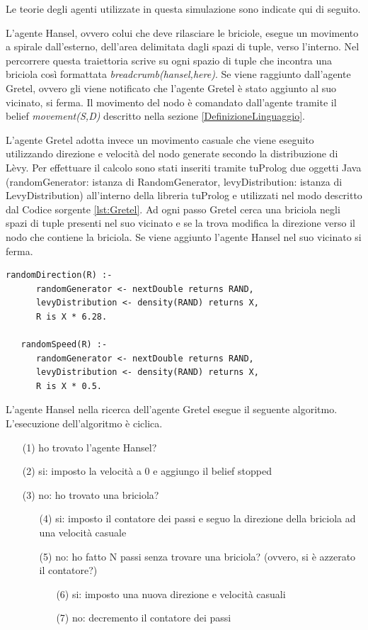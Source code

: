 \documentclass[12pt,a4paper,openright,twoside]{report}
\begin{document}
Le teorie degli agenti utilizzate in questa simulazione sono indicate qui di seguito.

L'agente Hansel, ovvero colui che deve rilasciare le briciole, esegue un movimento a spirale dall'esterno, dell'area delimitata dagli spazi di tuple, verso l'interno. Nel percorrere questa traiettoria scrive su ogni spazio di tuple che incontra una briciola cos\`i formattata \textit{breadcrumb(hansel,here)}.
Se viene raggiunto dall'agente Gretel, ovvero gli viene notificato che l'agente Gretel \`e stato aggiunto al suo vicinato, si ferma.
Il movimento del nodo \`e comandato dall'agente tramite il belief \textit{movement(S,D)} descritto nella sezione \ref{DefinizioneLinguaggio}.


L'agente Gretel adotta invece un movimento casuale che viene eseguito utilizzando direzione e velocit\`a del nodo generate secondo la distribuzione di L\`evy.
Per effettuare il calcolo sono stati inseriti tramite tuProlog due oggetti Java (randomGenerator: istanza di RandomGenerator, levyDistribution: istanza di LevyDistribution) all'interno della libreria tuProlog e utilizzati nel modo descritto dal Codice sorgente \ref{lst:Gretel}.
Ad ogni passo Gretel cerca una briciola negli spazi di tuple presenti nel suo vicinato e se la trova modifica la direzione verso il nodo che contiene la briciola.
Se viene aggiunto l'agente Hansel nel suo vicinato si ferma.
\medskip
\begin{lstlisting}[firstnumber=1,label={lst:Gretel},caption={Teoria agente Gretel}]
   randomDirection(R) :-
      randomGenerator <- nextDouble returns RAND,
      levyDistribution <- density(RAND) returns X,
      R is X * 6.28.

   randomSpeed(R) :-
      randomGenerator <- nextDouble returns RAND,
      levyDistribution <- density(RAND) returns X,
      R is X * 0.5.
\end{lstlisting}

L'agente Hansel nella ricerca dell'agente Gretel esegue il seguente algoritmo. L'esecuzione dell'algoritmo \`e ciclica.
\begin{itemize}
   \item[(1)] ho trovato l'agente Hansel?
   \item[(2)] si: imposto la velocit\`a a 0 e aggiungo il belief stopped
   \item[(3)] no: ho trovato una briciola?
   \begin{itemize}
      \item[(4)] si: imposto il contatore dei passi e seguo la direzione della briciola ad una velocit\`a casuale
      \item[(5)] no: ho fatto N passi senza trovare una briciola? (ovvero, si \`e azzerato il contatore?)
      \begin{itemize}
         \item[(6)] si: imposto una nuova direzione e velocit\`a casuali
         \item[(7)] no: decremento il contatore dei passi
      \end{itemize}
   \end{itemize}
\end{itemize}
\end{document}
